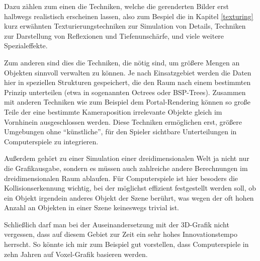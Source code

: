 Dazu zählen zum einen die Techniken, welche die gerenderten Bilder erst halbwegs realistisch erscheinen lassen, also zum Bespiel die in Kapitel \ref{texturing} kurz erwähnten Texturierungstechniken zur Simulation von Details, Techniken zur Darstellung von Reflexionen und Tiefenunschärfe, und viele weitere Spezialeffekte.

Zum anderen sind dies die Techniken, die nötig sind, um größere Mengen an Objekten sinnvoll verwalten zu können. Je nach Einsatzgebiet werden die Daten hier in speziellen Strukturen gespeichert, die den Raum nach einem bestimmten Prinzip unterteilen (etwa in sogenannten Octrees oder BSP-Trees). Zusammen mit anderen Techniken wie zum Beispiel dem Portal-Rendering können so große Teile der eine bestimmte Kameraposition irrelevante Objekte gleich im Vornhinein ausgeschlossen werden. Diese Techniken ermöglichen erst, größere Umgebungen ohne \enquote{künstliche}, für den Spieler sichtbare Unterteilungen in Computerspiele zu integrieren.

Außerdem gehört zu einer Simulation einer dreidimensionalen Welt ja nicht nur die Grafikausgabe, sondern es müssen auch zahlreiche andere Berechnungen im dreidimensionalen Raum ablaufen. Für Computerspiele ist hier besoders die Kollisionserkennung wichtig, bei der möglichst effizient festgestellt werden soll, ob ein Objekt irgendein anderes Objekt der Szene berührt, was wegen der oft hohen Anzahl an Objekten in einer Szene keineswegs trivial ist.

Schließlich darf man bei der Auseinandersetzung mit der 3D-Grafik nicht vergessen, dass auf diesem Gebiet zur Zeit ein sehr hohes Innovationstempo herrscht. So könnte ich mir zum Beispiel gut vorstellen, dass Computerspiele in zehn Jahren auf Voxel-Grafik basieren werden. \missing